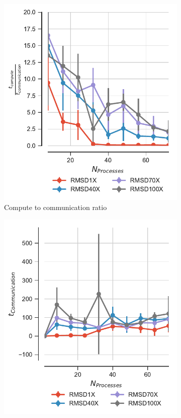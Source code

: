 \begin{figure}[ht!]
\centering
\begin{subfigure}{.4\textwidth}
  \includegraphics[width=\linewidth]{figures/Compute_to_comm_ratio_on_performance_v17.pdf}
\caption{Compute to communication ratio}
\label{fig:tcomp_tcomm_ratio}
\end{subfigure}
\hfill
\begin{subfigure}{.4\textwidth}
  \includegraphics[width=\linewidth]{figures/comm_comparison_different_RMSD_overload.pdf}

\end{subfigure}
\end{figure}

